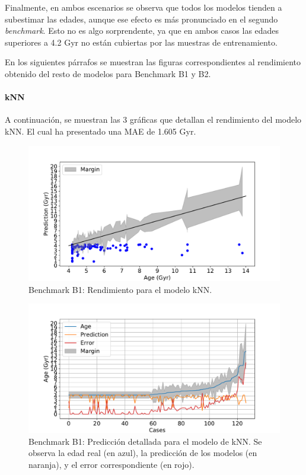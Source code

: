 Finalmente, en ambos escenarios se observa que todos los modelos tienden a subestimar las edades, aunque ese efecto es más pronunciado en el segundo \emph{benchmark}. Esto no es algo sorprendente, ya que en ambos casos las edades superiores a 4.2 Gyr no están cubiertas por las muestras de entrenamiento.

En los siguientes párrafos se muestran las figuras correspondientes al rendimiento obtenido del resto de modelos para Benchmark B1 y B2.

\paragraph{kNN} 
A continuación, se muestran las 3 gráficas que detallan el rendimiento del modelo kNN. El cual ha presentado una MAE de 1.605 Gyr.

\begin{figure}[H]
\begin{center}
 \includegraphics[width=0.8\linewidth]{Figuras/Experimentos/B_B1_knn_1.pdf}
\end{center}
\caption{Benchmark B1: Rendimiento para el modelo kNN.}
 \label{fig:benchB1_details_knn_1}
\end{figure}

\begin{figure}[H]
\begin{center}
 \includegraphics[width=0.8\linewidth]{Figuras/Experimentos/B_B1_knn_2.pdf}
\end{center}
\caption{Benchmark B1: Predicción detallada para el modelo de kNN. Se observa la edad real (en azul), la predicción de los modelos (en naranja), y el error correspondiente (en rojo).}
 \label{fig:benchB1_details_knn_2}
\end{figure}

